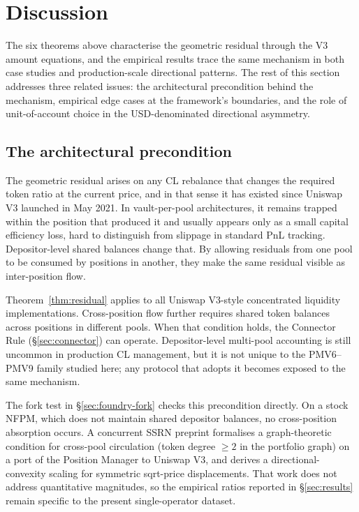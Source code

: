 \documentclass[11pt,a4paper]{article}
\theoremstyle{plain}
\begin{document}
\section{Discussion}\label{sec:discussion}

The six theorems above characterise the geometric residual through the V3 amount equations, and the empirical results trace the same mechanism in both case studies and production-scale directional patterns. The rest of this section addresses three related issues: the architectural precondition behind the mechanism, empirical edge cases at the framework's boundaries, and the role of unit-of-account choice in the USD-denominated directional asymmetry.

\subsection{The architectural precondition}\label{sec:precondition}

The geometric residual arises on any CL rebalance that changes the required token ratio at the current price, and in that sense it has existed since Uniswap V3 launched in May 2021. In vault-per-pool architectures, it remains trapped within the position that produced it and usually appears only as a small capital efficiency loss, hard to distinguish from slippage in standard PnL tracking. Depositor-level shared balances change that. By allowing residuals from one pool to be consumed by positions in another, they make the same residual visible as inter-position flow.

Theorem~\ref{thm:residual} applies to all Uniswap V3-style concentrated liquidity implementations. Cross-position flow further requires shared token balances across positions in different pools. When that condition holds, the Connector Rule (\S\ref{sec:connector}) can operate. Depositor-level multi-pool accounting is still uncommon in production CL management, but it is not unique to the PMV6--PMV9 family studied here; any protocol that adopts it becomes exposed to the same mechanism.

The fork test in \S\ref{sec:foundry-fork} checks this precondition directly. On a stock NFPM, which does not maintain shared depositor balances, no cross-position absorption occurs. A concurrent SSRN preprint\cite{secondoperator2026} formalises a graph-theoretic condition for cross-pool circulation (token degree $\geq 2$ in the portfolio graph) on a port of the Position Manager to Uniswap V3, and derives a directional-convexity scaling for symmetric sqrt-price displacements. That work does not address quantitative magnitudes, so the empirical ratios reported in \S\ref{sec:results} remain specific to the present single-operator dataset.
\end{document}
